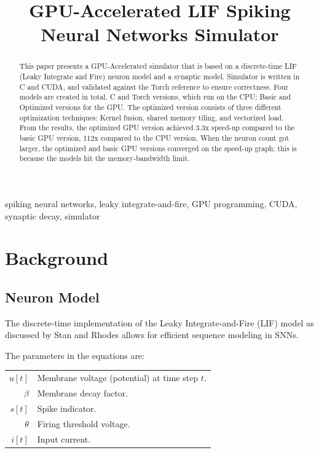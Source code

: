\documentclass[conference]{IEEEtran}
\title{GPU-Accelerated LIF Spiking Neural Networks Simulator}
\author{\IEEEauthorblockN{Emre Sagir}
\IEEEauthorblockA{\textit{Computer Engineering (GPU Programming Class)} \\
\textit{Politecnico di Torino}\\
Torino, Italy \\
s339049@studenti.polito.it}
}
\begin{document}
\maketitle

\begin{abstract}
    This paper presents a GPU-Accelerated simulator that is based on a discrete-time LIF (Leaky Integrate and Fire) neuron model and a synaptic model.
    Simulator is written in C and CUDA, and validated against the Torch reference to ensure correctness.
    Four models are created in total. C and Torch versions, which run on the CPU; Basic and Optimized versions for the GPU. 
    The optimized version consists of three different optimization techniques: Kernel fusion, shared memory tiling, and vectorized load.
    From the results, the optimized GPU version achieved 3.3x speed-up compared to the basic GPU version, 112x compared to the CPU version.
    When the neuron count got larger, the optimized and basic GPU versions converged on the speed-up graph; this is because the models hit the memory-bandwidth limit.
\end{abstract}

\begin{IEEEkeywords}
spiking neural networks, leaky integrate-and-fire, GPU programming, CUDA, synaptic decay, simulator
\end{IEEEkeywords}

\section{Background}

\subsection{Neuron Model}
The discrete-time implementation of the Leaky Integrate-and-Fire (LIF) model 
as discussed by Stan and Rhodes \cite{stan2024learning} allows for 
efficient sequence modeling in SNNs.

The parameters in the equations are: \\

\begin{tabular}{r l}
  $u[t]$ & Membrane voltage (potential) at time step $t$. \\[0.5em]
  $\beta$ & Membrane decay factor. \\[0.5em]
  $s[t]$ & Spike indicator. \\[0.5em]
  $\theta$ & Firing threshold voltage. \\[0.5em]
  $i[t]$ & Input current.
\end{tabular}
\\
\end{document}
